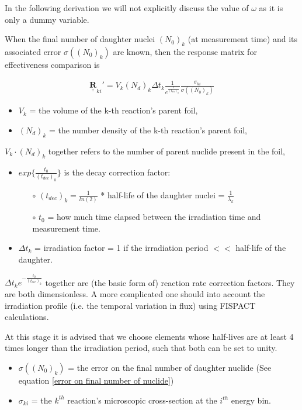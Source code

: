 \documentclass[a4paper, 12pt]{article}
\newcommand{\matr}[1]{\underline{\underline{\textbf{#1}}}}
\begin{document}
In the following derivation we will not explicitly discuss the value of $\omega$ as it is only a dummy variable.

When the final number of daughter nuclei $(N_0)_k$ (at measurement time) and its associated error $\sigma((N_0)_k)$ are known, then the response matrix for effectiveness comparison is

\begin{align}
	\matr{R}_{ki}' = V_k (N_d)_k \Delta t_k \frac{1}{e^{\frac{t}{(t_{dec})_k}}} \frac{\sigma_{ki}}{\sigma((N_0)_k)}
    \label{condensed effective matrix}
\end{align}

\begin{itemize}
    \item $V_k$ = the volume of the k-th reaction's parent foil,
    \item $(N_d)_k$ = the number density of the k-th reaction's parent foil,
\end{itemize}
$V_k \cdot (N_d)_k$ together refers to the number of parent nuclide present in the foil,
\begin{itemize}
    \item $exp\{\frac{t_0}{(t_{dec})_k}\}$ is the decay correction factor:
    \begin{itemize}
        \item[$\circ$] $(t_{dec})_k = \frac{1}{ln(2)}$ * half-life of the daughter nuclei = $\frac{1}{\lambda_k}$
        \item[$\circ$] $t_{0}$ = how much time elapsed between the irradiation time and measurement time. 
    \end{itemize}
    \item $\Delta t_k$ = irradiation factor = 1 if the irradiation period $<<$ half-life of the daughter.
\end{itemize}

${\Delta t_k} e^{-\frac{t_0}{(t_{dec})_k}}$ together are (the basic form of) reaction rate correction factors. They are both dimensionless. A more complicated one should into account the irradiation profile (i.e. the temporal variation in flux) using FISPACT calculations.

At this stage it is advised that we choose elements whose half-lives are at least 4 times longer than the irradiation period, such that both can be set to unity.

\begin{itemize}
    \item $\sigma((N_0)_k)$ = the error on the final number of daughter nuclide (See equation \ref{error on final number of nuclide})
    \item $\sigma_{ki}$ = the $k^{th}$ reaction's microscopic cross-section at the $i^{th}$ energy bin.
\end{itemize}
\end{document}
